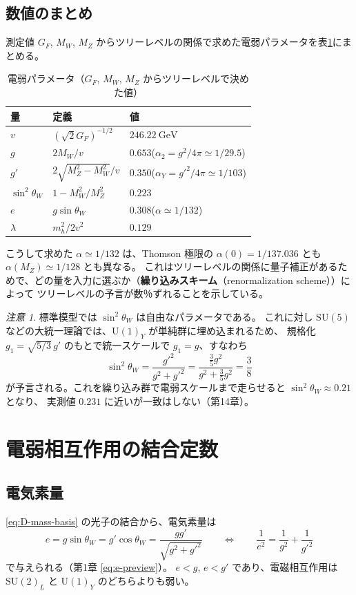 \documentclass[uplatex,dvipdfmx,a4paper,11pt,openany]{jsbook}
\newcommand{\term}[2]{\textbf{#1}（#2）}
\numberwithin{equation}{chapter}
\theoremstyle{definition}
\theoremstyle{plain}
\theoremstyle{remark}
\newtheorem{remark}{注意}[chapter]
\newcommand{\SU}{\mathrm{SU}}
\newcommand{\U}{\mathrm{U}}
\begin{document}
\subsection{数値のまとめ}
測定値 $G_F$, $M_W$, $M_Z$ からツリーレベルの関係で求めた電弱パラメータを表\ref{tab:EW-parameters}にまとめる。
\begin{table}[htbp]
\centering
\caption{電弱パラメータ（$G_F$, $M_W$, $M_Z$ からツリーレベルで決めた値）}
\label{tab:EW-parameters}
\begin{tabular}{lll}
\toprule
量 & 定義 & 値\\
\midrule
$v$ & $(\sqrt2G_F)^{-1/2}$ & $246.22\ \mathrm{GeV}$\\
$g$ & $2M_W/v$ & $0.653$\quad($\alpha_2=g^2/4\pi\simeq1/29.5$)\\
$g'$ & $2\sqrt{M_Z^2-M_W^2}/v$ & $0.350$\quad($\alpha_Y=g'^2/4\pi\simeq1/103$)\\
$\sin^2\theta_W$ & $1-M_W^2/M_Z^2$ & $0.223$\\
$e$ & $g\sin\theta_W$ & $0.308$\quad($\alpha\simeq1/132$)\\
$\lambda$ & $m_h^2/2v^2$ & $0.129$\\
\bottomrule
\end{tabular}
\end{table}
こうして求めた $\alpha\simeq1/132$ は、Thomson 極限の $\alpha(0)=1/137.036$ とも $\alpha(M_Z)\simeq1/128$ とも異なる。
これはツリーレベルの関係に量子補正があるためで、どの量を入力に選ぶか（\term{繰り込みスキーム}{renormalization scheme}）によって
ツリーレベルの予言が数％ずれることを示している。
\begin{remark}
標準模型では $\sin^2\theta_W$ は自由なパラメータである。
これに対し $\SU(5)$ などの大統一理論では、$\U(1)_Y$ が単純群に埋め込まれるため、
規格化 $g_1=\sqrt{5/3}\,g'$ のもとで統一スケールで $g_1=g$、すなわち
\[
\sin^2\theta_W=\frac{g'^2}{g^2+g'^2}=\frac{\frac35g^2}{g^2+\frac35g^2}=\frac38
\]
が予言される。これを繰り込み群で電弱スケールまで走らせると $\sin^2\theta_W\approx0.21$ となり、
実測値 $0.231$ に近いが一致はしない（第14章）。
\end{remark}
\section{電弱相互作用の結合定数}
\label{sec:EW-couplings}
\subsection{電気素量}
\eqref{eq:D-mass-basis} の光子の結合から、電気素量は
\begin{equation}
\boxed{e=g\sin\theta_W=g'\cos\theta_W=\frac{gg'}{\sqrt{g^2+g'^2}}}
\qquad\Longleftrightarrow\qquad
\frac{1}{e^2}=\frac{1}{g^2}+\frac{1}{g'^2}
\label{eq:e-gg}
\end{equation}
で与えられる（第1章 \eqref{eq:e-preview}）。
$e<g$, $e<g'$ であり、電磁相互作用は $\SU(2)_L$ と $\U(1)_Y$ のどちらよりも弱い。
\end{document}
